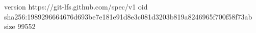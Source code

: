 version https://git-lfs.github.com/spec/v1
oid sha256:1989296664676d693be7e181e91d8e3c081d3203b819a8246965f700f58f73ab
size 99552

